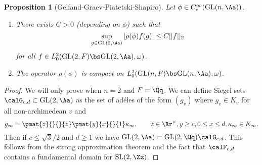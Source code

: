 \documentclass{article}
\newcommand{\GL}{\mathrm{GL}}
\newcommand{\SL}{\mathrm{SL}}
\newtheorem{proposition}{Proposition}[section]
\begin{document}
\begin{proposition}[Gelfand-Graev-Piatetski-Shapiro]
\label{compactad}
Let $\phi\in C_{c}^{\infty}(\GL(n, \Aa))$. 
\begin{enumerate}
\item There exists $C>0$ (depending on $\phi$) such that 
$$
\sup_{g\in \GL(2, \Aa)} |\rho(\phi)f(g)| \leq C||f||_{2}
$$
for all $f\in L_{0}^{2}(\GL(2, F) \bs \GL(2,\Aa), \omega)$. 
\item The operator $\rho(\phi)$ is compact on $L_{0}^{2}(\GL(n, F)\bs \GL(n, \Aa), \omega)$. 
\end{enumerate}
\end{proposition}
\begin{proof}
We will only prove when $n = 2$ and $F = \Qq$. 
We can define Siegel sets $\calG_{c, d}\subset \GL(2, \Aa)$ as the set of ad\'eles of the form $(g_{v})$ where $g_{v} \in K_v$ for all non-archimedean $v$ and 
$$
g_{\infty} = \pmat{z}{}{}{z} \pmat{y}{x}{}{1} \kappa_{\infty}, \qquad z\in \Rr^{\times}, y\geq c, 0\leq x\leq d, \kappa_{\infty} \in K_{\infty}. 
$$
Then if $c\leq \sqrt{3}/2$ and $d\geq 1$ we have $\GL(2, \Aa) = \GL(2, \Qq) \calG_{c, d}$. 
This follows from the strong approximation theorem and the fact that $\calF_{c, d}$ contains a fundamental domain for $\SL(2, \Zz)$. 


\end{proof}
\end{document}
